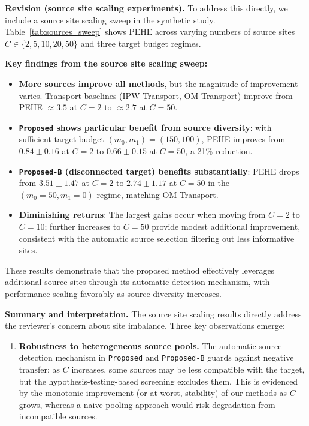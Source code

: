 {\noindent
\textbf{Revision (source site scaling experiments).}
To address this directly, we include a source site scaling sweep in the synthetic study. Table~\ref{tab:sources_sweep} shows PEHE across varying numbers of source sites $C \in \{2, 5, 10, 20, 50\}$ and three target budget regimes.



\noindent\textbf{Key findings from the source site scaling sweep:}
\begin{itemize}
\item \textbf{More sources improve all methods}, but the magnitude of improvement varies. Transport baselines (IPW-Transport, OM-Transport) improve from PEHE $\approx 3.5$ at $C=2$ to $\approx 2.7$ at $C=50$.
\item \textbf{\texttt{Proposed} shows particular benefit from source diversity}: with sufficient target budget $(m_0, m_1) = (150, 100)$, PEHE improves from $0.84 \pm 0.16$ at $C=2$ to $0.66 \pm 0.15$ at $C=50$, a 21\% reduction.
\item \textbf{\texttt{Proposed-B} (disconnected target) benefits substantially}: PEHE drops from $3.51 \pm 1.47$ at $C=2$ to $2.74 \pm 1.17$ at $C=50$ in the $(m_0=50, m_1=0)$ regime, matching OM-Transport.
\item \textbf{Diminishing returns}: The largest gains occur when moving from $C=2$ to $C=10$; further increases to $C=50$ provide modest additional improvement, consistent with the automatic source selection filtering out less informative sites.
\end{itemize}

These results demonstrate that the proposed method effectively leverages additional source sites through its automatic detection mechanism, with performance scaling favorably as source diversity increases.

\medskip
\noindent\textbf{Summary and interpretation.}
The source site scaling results directly address the reviewer's concern about site imbalance. Three key observations emerge:

\begin{enumerate}[leftmargin=*]
\item \textbf{Robustness to heterogeneous source pools.} The automatic source detection mechanism in \texttt{Proposed} and \texttt{Proposed-B} guards against negative transfer: as $C$ increases, some sources may be less compatible with the target, but the hypothesis-testing-based screening excludes them. This is evidenced by the monotonic improvement (or at worst, stability) of our methods as $C$ grows, whereas a naive pooling approach would risk degradation from incompatible sources.


\end{enumerate}}
